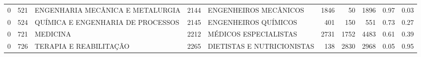 \begin{tabular}{rrlrlrrrrr}
       0 &    521 &                   ENGENHARIA MECÂNICA E METALURGIA & 2144 &                             ENGENHEIROS MECÂNICOS & 1846 &    50 &   1896 & 0.97 & 0.03 \\
       0 &    524 &                  QUÍMICA E ENGENHARIA DE PROCESSOS & 2145 &                              ENGENHEIROS QUÍMICOS &  401 &   150 &    551 & 0.73 & 0.27 \\
       0 &    721 &                                           MEDICINA & 2212 &                             MÉDICOS ESPECIALISTAS & 2731 &  1752 &   4483 & 0.61 & 0.39 \\
       0 &    726 &                             TERAPIA E REABILITAÇÃO & 2265 &                        DIETISTAS E NUTRICIONISTAS &  138 &  2830 &   2968 & 0.05 & 0.95 \\
\bottomrule
\end{tabular}
